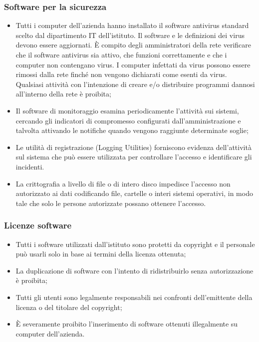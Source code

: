 \documentclass[12pt, a4paper, titlepage]{report}
\begin{document}
		\subsubsection{Software per la sicurezza}
		\begin{itemize}
			\item Tutti i computer dell'azienda hanno installato il software antivirus standard scelto dal dipartimento IT dell'istituto. Il software e le definizioni dei virus devono essere aggiornati. È compito degli amministratori della rete verificare che il software antivirus sia attivo, che funzioni correttamente e che i computer non contengano virus. I computer infettati da virus possono essere rimossi dalla rete finché non vengono dichiarati come esenti da virus. Qualsiasi attività con l'intenzione di creare e/o distribuire programmi dannosi all'interno della rete è proibita;
			\item Il software di monitoraggio esamina periodicamente l'attività sui sistemi, cercando gli indicatori di compromesso configurati dall'amministrazione e talvolta attivando le notifiche quando vengono raggiunte determinate soglie;
			\item Le utilità di registrazione (Logging Utilities) forniscono evidenza dell'attività sul sistema che può essere utilizzata per controllare l'accesso e identificare gli incidenti.
			\item La crittografia a livello di file o di intero disco impedisce l'accesso non autorizzato ai dati codificando file, cartelle o interi sistemi operativi, in modo tale che solo le persone autorizzate possano ottenere l'accesso.
		\end{itemize}
		
		
		\subsubsection{Licenze software}
		\begin{itemize}
			\item Tutti i software utilizzati dall'istituto sono protetti da copyright e il personale può usarli solo in base ai termini della licenza ottenuta;
			\item La duplicazione di software con l'intento di ridistribuirlo senza autorizzazione è proibita;
			\item Tutti gli utenti sono legalmente responsabili nei confronti dell'emittente della licenza o del titolare del copyright;
			\item È severamente proibito l'inserimento di software ottenuti illegalmente su computer dell'azienda.
		\end{itemize}
	
\end{document}

